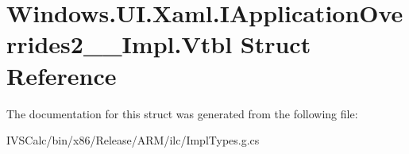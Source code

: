 \hypertarget{struct_windows_1_1_u_i_1_1_xaml_1_1_i_application_overrides2_____impl_1_1_vtbl}{}\section{Windows.\+U\+I.\+Xaml.\+I\+Application\+Overrides2\+\_\+\+\_\+\+Impl.\+Vtbl Struct Reference}
\label{struct_windows_1_1_u_i_1_1_xaml_1_1_i_application_overrides2_____impl_1_1_vtbl}


The documentation for this struct was generated from the following file\+:\begin{DoxyCompactItemize}
\item 
I\+V\+S\+Calc/bin/x86/\+Release/\+A\+R\+M/ilc/Impl\+Types.\+g.\+cs\end{DoxyCompactItemize}
